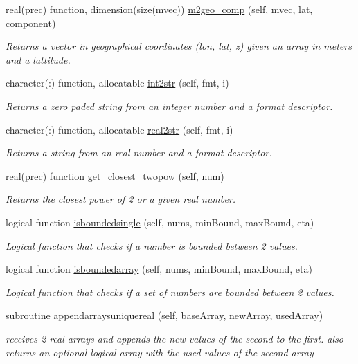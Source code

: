\begin{DoxyCompactItemize}
real(prec) function, dimension(size(mvec)) \mbox{\hyperlink{namespaceutilities__mod_ae6b8a45b229e3f1f8c2b12dd74e7a2dd}{m2geo\+\_\+comp}} (self, mvec, lat, component)
\begin{DoxyCompactList}\small\item\em Returns a vector in geographical coordinates (lon, lat, z) given an array in meters and a lattitude. \end{DoxyCompactList}\item 
character(\+:) function, allocatable \mbox{\hyperlink{namespaceutilities__mod_a6ba00b0a503f26c7e755d1efbbe83c5b}{int2str}} (self, fmt, i)
\begin{DoxyCompactList}\small\item\em Returns a zero paded string from an integer number and a format descriptor. \end{DoxyCompactList}\item 
character(\+:) function, allocatable \mbox{\hyperlink{namespaceutilities__mod_a2c8481f2b9f4cddf8391bd1e8b624335}{real2str}} (self, fmt, i)
\begin{DoxyCompactList}\small\item\em Returns a string from an real number and a format descriptor. \end{DoxyCompactList}\item 
real(prec) function \mbox{\hyperlink{namespaceutilities__mod_a164054d89c012d95f63c12a6cc0ac8d7}{get\+\_\+closest\+\_\+twopow}} (self, num)
\begin{DoxyCompactList}\small\item\em Returns the closest power of 2 or a given real number. \end{DoxyCompactList}\item 
logical function \mbox{\hyperlink{namespaceutilities__mod_a258d85bcc477041275bd954667168ea3}{isboundedsingle}} (self, nums, min\+Bound, max\+Bound, eta)
\begin{DoxyCompactList}\small\item\em Logical function that checks if a number is bounded between 2 values. \end{DoxyCompactList}\item 
logical function \mbox{\hyperlink{namespaceutilities__mod_a1d16eada2f4cb344ad1500b3edba43fa}{isboundedarray}} (self, nums, min\+Bound, max\+Bound, eta)
\begin{DoxyCompactList}\small\item\em Logical function that checks if a set of numbers are bounded between 2 values. \end{DoxyCompactList}\item 
subroutine \mbox{\hyperlink{namespaceutilities__mod_abffd01c3faf22f44e260c42c6f95d5c4}{appendarraysuniquereal}} (self, base\+Array, new\+Array, used\+Array)
\begin{DoxyCompactList}\small\item\em receives 2 real arrays and appends the new values of the second to the first. also returns an optional logical array with the used values of the second array \end{DoxyCompactList}\end{DoxyCompactItemize}
